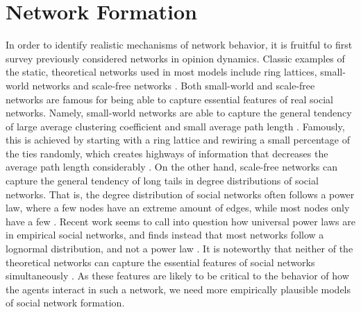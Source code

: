 \documentclass{article}
\begin{document}
\section{Network Formation}
In order to identify realistic mechanisms of network behavior, it is fruitful to first survey previously considered networks in opinion dynamics. 
Classic examples of the static, theoretical networks used in most models include ring lattices, small-world networks and scale-free networks \cite{barabasi_scale-free_2003,watts_collective_1998}. Both small-world and scale-free networks are famous for being able to capture essential features of real social networks. Namely, small-world networks are able to capture the general tendency of large average clustering coefficient and small average path length \cite{watts_collective_1998}. Famously, this is achieved by starting with a ring lattice and rewiring a small percentage of the ties randomly, which creates highways of information that decreases the average path length considerably \cite{watts_collective_1998}. On the other hand, scale-free networks can capture the general tendency of long tails in degree distributions of social networks. That is, the degree distribution of social networks often follows a power law, where a few nodes have an extreme amount of edges, while most nodes only have a few \cite{barabasi_scale-free_2003}. Recent work seems to call into question how universal power laws are in empirical social networks, and finds instead that most networks follow a lognormal distribution, and not a power law \cite{broido_scale-free_2019}. It is noteworthy that neither of the theoretical networks can capture the essential features of social networks simultaneously \cite{jackson_search_2004}. As these features are likely to be critical to the behavior of how the agents interact in such a network, we need more empirically plausible models of social network formation. 
\end{document}

